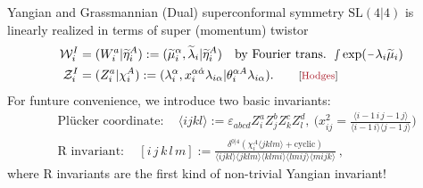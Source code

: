 \documentclass[10pt]{beamer}
\renewcommand{\tilde}{\widetilde}
\newcommand{\mi}{\raisebox{0.75pt}{\scalebox{0.75}{$\hspace{-1pt}\,-\,\hspace{-0.75pt}$}}}
\begin{document}
\begin{frame}[fragile]{Yangian and Grassmannian}
 (Dual) superconformal symmetry $\mathrm{SL}(4\vert 4)$ is linearly realized in terms of super (momentum) twistor
 \begin{align*}
 \mathcal{W}_{i}^{I}&=(W_{i}^{a}\vert \tilde{\eta}_{i}^{A}) := (\tilde{\mu}_{i}^{\alpha},\tilde{\lambda}_{i}\vert  \tilde{\eta}_{i}^{A}) \quad \text{by Fourier trans. } \smallint \exp(\mi\lambda_{i}\tilde{\mu}_{i}) \\
 \mathcal{Z}_{i}^{I}&=(Z_{i}^{a}\vert \chi_{i}^{A}):=(\lambda_{i}^{\alpha},x_{i}^{\alpha\dot{\alpha}}\lambda_{i\alpha}\vert\theta_{i}^{\alpha A}\lambda_{i\alpha}). \qquad {\footnotesize\text{[\textcolor{darkred}{Hodges}] }}
 \end{align*}
 For funture convenience, we introduce two basic invariants:
 \begin{align*}
     &\text{Pl\"{u}cker coordinate}:\quad \langle ijkl\rangle :=\varepsilon_{abcd}Z_{i}^{a}Z_{j}^{b}Z_{k}^{c}Z_{l}^{d}, \: 
    \biggl( x_{ij}^{2}=\frac{\langle i{-}1\,i\,j{-}1\,j\rangle}{\langle i{-}1\,i\rangle\langle j{-}1\,j\rangle}\biggr) \\ 
     &\text{R invariant}:\quad [i\,j\,k\,l\,m]:=\frac{\delta^{0\vert 4}(\chi_{i}^{A}\langle jklm\rangle+\text{cyclic})}{\langle ijkl\rangle\langle jklm\rangle\langle klmi\rangle\langle lmij\rangle\langle mijk\rangle} \:,
 \end{align*}
where R invariants are the first kind of non-trivial Yangian invariant!
\end{frame}
\end{document}
